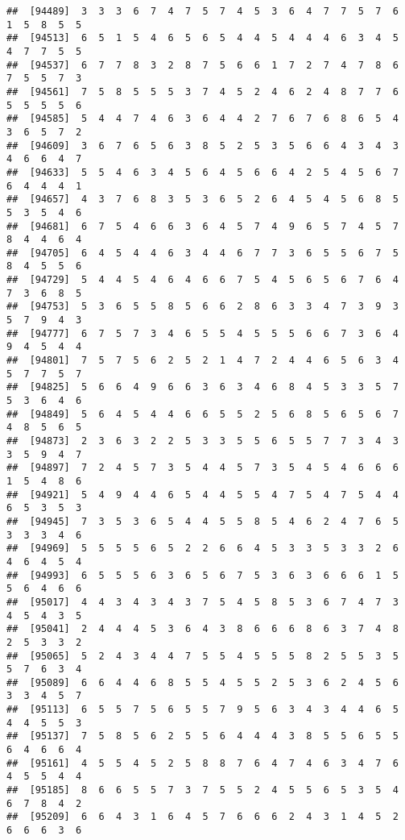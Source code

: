 \documentclass[
]{book}
\begin{document}
\begin{verbatim}
##  [94489]  3  3  3  6  7  4  7  5  7  4  5  3  6  4  7  7  5  7  6  1  5  8  5  5
##  [94513]  6  5  1  5  4  6  5  6  5  4  4  5  4  4  4  6  3  4  5  4  7  7  5  5
##  [94537]  6  7  7  8  3  2  8  7  5  6  6  1  7  2  7  4  7  8  6  7  5  5  7  3
##  [94561]  7  5  8  5  5  5  3  7  4  5  2  4  6  2  4  8  7  7  6  5  5  5  5  6
##  [94585]  5  4  4  7  4  6  3  6  4  4  2  7  6  7  6  8  6  5  4  3  6  5  7  2
##  [94609]  3  6  7  6  5  6  3  8  5  2  5  3  5  6  6  4  3  4  3  4  6  6  4  7
##  [94633]  5  5  4  6  3  4  5  6  4  5  6  6  4  2  5  4  5  6  7  6  4  4  4  1
##  [94657]  4  3  7  6  8  3  5  3  6  5  2  6  4  5  4  5  6  8  5  5  3  5  4  6
##  [94681]  6  7  5  4  6  6  3  6  4  5  7  4  9  6  5  7  4  5  7  8  4  4  6  4
##  [94705]  6  4  5  4  4  6  3  4  4  6  7  7  3  6  5  5  6  7  5  8  4  5  5  6
##  [94729]  5  4  4  5  4  6  4  6  6  7  5  4  5  6  5  6  7  6  4  7  3  6  8  5
##  [94753]  5  3  6  5  5  8  5  6  6  2  8  6  3  3  4  7  3  9  3  5  7  9  4  3
##  [94777]  6  7  5  7  3  4  6  5  5  4  5  5  5  6  6  7  3  6  4  9  4  5  4  4
##  [94801]  7  5  7  5  6  2  5  2  1  4  7  2  4  4  6  5  6  3  4  5  7  7  5  7
##  [94825]  5  6  6  4  9  6  6  3  6  3  4  6  8  4  5  3  3  5  7  5  3  6  4  6
##  [94849]  5  6  4  5  4  4  6  6  5  5  2  5  6  8  5  6  5  6  7  4  8  5  6  5
##  [94873]  2  3  6  3  2  2  5  3  3  5  5  6  5  5  7  7  3  4  3  3  5  9  4  7
##  [94897]  7  2  4  5  7  3  5  4  4  5  7  3  5  4  5  4  6  6  6  1  5  4  8  6
##  [94921]  5  4  9  4  4  6  5  4  4  5  5  4  7  5  4  7  5  4  4  6  5  3  5  3
##  [94945]  7  3  5  3  6  5  4  4  5  5  8  5  4  6  2  4  7  6  5  3  3  3  4  6
##  [94969]  5  5  5  5  6  5  2  2  6  6  4  5  3  3  5  3  3  2  6  4  6  4  5  4
##  [94993]  6  5  5  5  6  3  6  5  6  7  5  3  6  3  6  6  6  1  5  5  6  4  6  6
##  [95017]  4  4  3  4  3  4  3  7  5  4  5  8  5  3  6  7  4  7  3  4  5  4  3  5
##  [95041]  2  4  4  4  5  3  6  4  3  8  6  6  6  8  6  3  7  4  8  2  5  3  3  2
##  [95065]  5  2  4  3  4  4  7  5  5  4  5  5  5  8  2  5  5  3  5  5  7  6  3  4
##  [95089]  6  6  4  4  6  8  5  5  4  5  5  2  5  3  6  2  4  5  6  3  3  4  5  7
##  [95113]  6  5  5  7  5  6  5  5  7  9  5  6  3  4  3  4  4  6  5  4  4  5  5  3
##  [95137]  7  5  8  5  6  2  5  5  6  4  4  4  3  8  5  5  6  5  5  6  4  6  6  4
##  [95161]  4  5  5  4  5  2  5  8  8  7  6  4  7  4  6  3  4  7  6  4  5  5  4  4
##  [95185]  8  6  6  5  5  7  3  7  5  5  2  4  5  5  6  5  3  5  4  6  7  8  4  2
##  [95209]  6  6  4  3  1  6  4  5  7  6  6  6  2  4  3  1  4  5  2  6  6  6  3  6

\end{verbatim}
\end{document}
